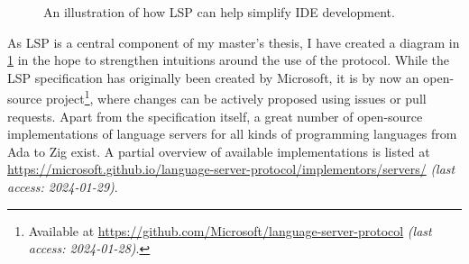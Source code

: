 \documentclass{scrartcl}
\newcommand{\web}[2]{\url{#1} \textit{(last access: #2)}}
\begin{document}
\begin{figure}
	\begin{center}
	\end{center}
	\caption{An illustration of how LSP can help simplify IDE development.}\label{fig:lsp}
\end{figure}

\noindent{}As LSP is a central component of my master's thesis, I have created a diagram in \cref{fig:lsp} in the hope to strengthen intuitions around the use of the protocol.
While the LSP specification has originally been created by Microsoft, it is by now an open-source project\footnote{
	Available at \web{https://github.com/Microsoft/language-server-protocol}{2024-01-28}.
}, where changes can be actively proposed using issues or pull requests.
Apart from the specification itself, a great number of open-source implementations of language servers for all kinds of programming languages from Ada to Zig exist.
A partial overview of available implementations is listed at \web{https://microsoft.github.io/language-server-protocol/implementors/servers/}{2024-01-29}.
\end{document}
